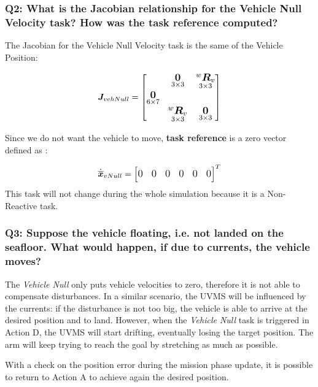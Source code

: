 \documentclass{article}
\begin{document}
\subsubsection{Q2: What is the Jacobian relationship for the Vehicle Null Velocity task? How was the task reference computed?}

The Jacobian for the Vehicle Null Velocity task is the same of the Vehicle Position:

\begin{equation}
\large
\boldsymbol{J}_{vehNull}=    \begin{bmatrix}
     & \underset{3\times 3}{\boldsymbol{0}} & \underset{ 3\times 3}{^{w}\boldsymbol{R}_{v}} \\
     \underset{6\times 7}{\boldsymbol{0}} \\
     & \underset{ 3\times 3}{^{w}\boldsymbol{R}_{v}} & \underset{3\times 3}{\boldsymbol{0}} \\
    \end{bmatrix}
\end{equation}

Since we do not want the vehicle to move, \textbf{task reference} is a zero vector defined as : 

\begin{equation}
\large
   \dot{\overline{\boldsymbol{x}}}_{vNull} =  \begin{bmatrix} 0 & 0 & 0 & 0 & 0 & 0 \end{bmatrix}^{T}
\end{equation}
This task will not change during the whole simulation because it is a Non-Reactive task.

\subsubsection{Q3: Suppose the vehicle floating, i.e. not landed on the seafloor. What would happen, if due to currents, the vehicle moves?}
The \textit{Vehicle Null} only puts vehicle velocities to zero, therefore it is not able to compensate disturbances. In a similar scenario, the UVMS will be influenced by the currents: if the disturbance is not too big, the vehicle is able to arrive at the desired position and to land. However, when the \textit{Vehicle Null} task is triggered in Action D, the UVMS will start drifting, eventually losing the target position. The arm will keep trying to reach the goal by stretching as much as possible.

With a check on the position error during the mission phase update, it is possible to return to Action A to achieve again the desired position.
\end{document}
